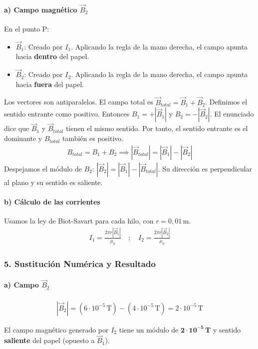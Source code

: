 \paragraph*{a) Campo magnético $\vec{B}_2$}
En el punto P:
\begin{itemize}
    \item $\vec{B}_1$: Creado por $I_1$. Aplicando la regla de la mano derecha, el campo apunta hacia \textbf{dentro} del papel.
    \item $\vec{B}_2$: Creado por $I_2$. Aplicando la regla de la mano derecha, el campo apunta hacia \textbf{fuera} del papel.
\end{itemize}
Los vectores son antiparalelos. El campo total es $\vec{B}_{total} = \vec{B}_1 + \vec{B}_2$.
Definimos el sentido entrante como positivo. Entonces $B_1 = +|\vec{B}_1|$ y $B_2 = -|\vec{B}_2|$.
El enunciado dice que $\vec{B}_1$ y $\vec{B}_{total}$ tienen el mismo sentido. Por tanto, el sentido entrante es el dominante y $B_{total}$ también es positivo.
\begin{gather}
    B_{total} = B_1 + B_2 \implies |\vec{B}_{total}| = |\vec{B}_1| - |\vec{B}_2|
\end{gather}
Despejamos el módulo de $B_2$: $|\vec{B}_2| = |\vec{B}_1| - |\vec{B}_{total}|$. Su dirección es perpendicular al plano y su sentido es saliente.

\paragraph*{b) Cálculo de las corrientes}
Usamos la ley de Biot-Savart para cada hilo, con $r=0,01\,\text{m}$.
\begin{gather}
    I_1 = \frac{2\pi r |\vec{B}_1|}{\mu_0} \quad ; \quad I_2 = \frac{2\pi r |\vec{B}_2|}{\mu_0}
\end{gather}

\subsubsection*{5. Sustitución Numérica y Resultado}
\paragraph*{a) Campo $\vec{B}_2$}
\begin{gather}
    |\vec{B}_2| = (6\cdot10^{-5}\,\text{T}) - (4\cdot10^{-5}\,\text{T}) = 2\cdot10^{-5}\,\text{T}
\end{gather}
\begin{cajaresultado}
    El campo magnético generado por $I_2$ tiene un módulo de $\boldsymbol{2\cdot10^{-5}\,\textbf{T}}$ y sentido \textbf{saliente} del papel (opuesto a $\vec{B}_1$).
\end{cajaresultado}
